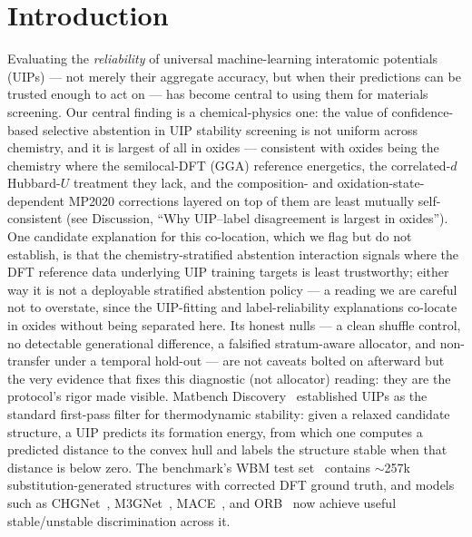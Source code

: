 \documentclass[aip,jcp,preprint,superscriptaddress,amsmath,amssymb]{revtex4-2}
\begin{document}
\maketitle

\section{Introduction}

Evaluating the \emph{reliability} of universal machine-learning interatomic potentials
(UIPs) --- not merely their aggregate accuracy, but when their predictions can be trusted
enough to act on --- has become central to using them for materials screening. Our central
finding is a chemical-physics one: the value of confidence-based selective abstention in UIP
stability screening is not uniform across chemistry, and it is largest of all in oxides ---
consistent with oxides being the chemistry where the semilocal-DFT (GGA) reference energetics,
the correlated-$d$ Hubbard-$U$ treatment they lack, and the composition- and
oxidation-state-dependent MP2020 corrections layered on top of them are least mutually
self-consistent (see Discussion, ``Why UIP--label disagreement is largest in oxides''). One
candidate explanation for this co-location, which we flag but do not establish, is that the
chemistry-stratified abstention interaction signals where the DFT reference data underlying UIP
training targets is least trustworthy; either way it is not a deployable stratified abstention
policy --- a reading we are careful not to overstate, since the UIP-fitting and label-reliability
explanations co-locate in oxides without being separated here.
Its honest nulls --- a clean shuffle control, no detectable generational difference, a falsified
stratum-aware allocator, and non-transfer under a temporal hold-out --- are not caveats bolted on
afterward but the very evidence that fixes this diagnostic (not allocator) reading: they are the
protocol's rigor made visible.
Matbench Discovery~\citep{riebesell2025} established UIPs as the
standard first-pass filter for thermodynamic stability: given a relaxed candidate structure,
a UIP predicts its formation energy, from which one computes a predicted distance to the
convex hull and labels the structure stable when that distance is below zero. The
benchmark's WBM test set~\citep{wang2021} contains $\sim$257k substitution-generated
structures with corrected DFT ground truth, and models such as CHGNet~\citep{deng2023},
M3GNet~\citep{chen2022}, MACE~\citep{batatia2022mace}, and ORB~\citep{neumann2024} now
achieve useful stable/unstable discrimination across it.
\end{document}
